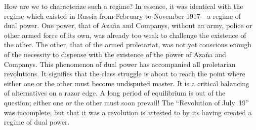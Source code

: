 How are we to characterize such a regime? In essence, it was identical with the regime which existed in Russia from February to November 1917—a regime of dual power. One power, that of Azaña and Companys, without an army, police or other armed force of its own, was already too weak to challenge the existence of the other. The other, that of the armed proletariat, was not yet conscious enough of the necessity to dispense with the existence of the power of Azaña and Companys. This phenomenon of dual power has accompanied all proletarian revolutions. It signifies that the class struggle is about to reach the point where either one or the other must become undisputed master. It is a critical balancing of alternatives on a razor edge. A long period of equilibrium is out of the question; either one or the other must soon prevail! The ``Revolution of July~19'' was incomplete, but that it was a revolution is attested to by its having created a regime of dual power.